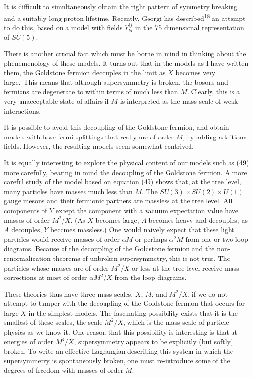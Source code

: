 It is difficult to simultaneously obtain the right pattern of
symmetry breaking and a suitably long proton lifetime. Recently,
Georgi has described\textsuperscript{18} an attempt to do this, based on a model with
fields $Y^{ij}_{kl}$ in the 75 dimensional representation of $SU(5)$.

There is another crucial fact which must be borne in mind in
thinking about the phenomenology of these models. It turns out that
in the models as I have written them, the Goldstone fermion decouples
in the limit as $X$ becomes very large.\begingroup\renewcommand{\thefootnote}{\fnsymbol{footnote}}\footnotemark[1]\endgroup\ This means that although
supersymmetry is broken, the bosons and fermions are degenerate to
within terms of much less than $M$. Clearly, this is a very unacceptable
state of affairs if $M$ is interpreted as the mass scale of weak
interactions.

It is possible to avoid this decoupling of the Goldstone fermion,
and obtain models with bose-fermi splittings that really are of order
$M$, by adding additional fields. However, the resulting models seem
somewhat contrived.

It is equally interesting to explore the physical content of
our models such as (49) more carefully, bearing in mind the decoupling
of the Goldstone fermion. A more careful study of the model
based on equation (49) shows that, at the tree level, many particles
have masses much less than $M$. The $SU(3) \times SU(2) \times U(1)$ gauge mesons
and their fermionic partners are massless at the tree level. All
components of $Y$ except the component with a vacuum expectation value
have masses of order $M^2/X$. (As $X$ becomes large, $A$ becomes heavy and
decouples; as $A$ decouples, $Y$ becomes massless.) One would naively
expect that these light particles would receive masses of order $\alpha M$
or perhaps $\alpha^2 M$ from one or two loop diagrams. Because of the
decoupling of the Goldstone fermion and the non-renormalization theorems
of unbroken supersymmetry, this is not true. The particles
whose masses are of order $M^2/X$ or less at the tree level receive mass
corrections at most of order $\alpha M^2/X$ from the loop diagrams.

\begingroup
\renewcommand{\thefootnote}{\fnsymbol{footnote}}
\endgroup

These theories thus have three mass scales, $X$, $M$, and $M^2/X$, if
we do not attempt to tamper with the decoupling of the Goldstone
fermion that occurs for large $X$ in the simplest models. The fascinating
possibility exists that it is the smallest of these scales, the
scale $M^2/X$, which is the mass scale of particle physics as we know it.
One reason that this possibility is interesting is that at energies
of order $M^2/X$, supersymmetry appears to be explicitly (but softly)
broken. To write an effective Lagrangian describing this system in
which the supersymmetry is spontaneously broken, one must re-introduce
some of the degrees of freedom with masses of order $M$.

